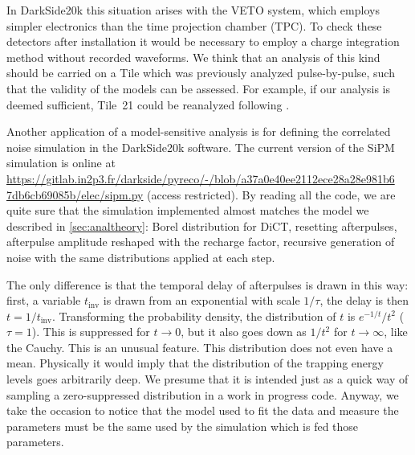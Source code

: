 In DarkSide20k this situation arises with the VETO system, which employs
simpler electronics than the time projection chamber (TPC). To check these
detectors after installation it would be necessary to employ a charge
integration method without recorded waveforms. We think that an analysis of
this kind should be carried on a Tile which was previously analyzed
pulse-by-pulse, such that the validity of the models can be assessed. For
example, if our analysis is deemed sufficient, Tile~21 could be reanalyzed
following \cite{chmill2017}.


Another application of a model-sensitive analysis is for defining the
correlated noise simulation in the DarkSide20k software. The current version of
the SiPM simulation is online at
\url{https://gitlab.in2p3.fr/darkside/pyreco/-/blob/a37a0e40ee2112ece28a28e981b6
 7db6cb69085b/elec/sipm.py} (access restricted). By reading all the code, we
are quite sure that the simulation implemented almost matches the model we
described in \autoref{sec:analtheory}: Borel distribution for DiCT, resetting
afterpulses, afterpulse amplitude reshaped with the recharge factor, recursive
generation of noise with the same distributions applied at each step.

The only difference is that the temporal delay of afterpulses is drawn in this
way: first, a variable $t_\text{inv}$ is drawn from an exponential with scale
$1/\tau$, the delay is then $t = 1/t_\text{inv}$. Transforming the probability
density, the distribution of $t$ is $e^{-1/t}/t^2$ ($\tau = 1$). This is
suppressed for $t\to 0$, but it also goes down as $1/t^2$ for $t\to\infty$,
like the Cauchy. This is an unusual feature. This distribution does not even
have a mean. Physically it would imply that the distribution of the trapping
energy levels goes arbitrarily deep. We presume that it is intended just as a
quick way of sampling a zero-suppressed distribution in a work in progress
code. Anyway, we take the occasion to notice that the model used to fit the
data and measure the parameters must be the same used by the simulation which
is fed those parameters.
